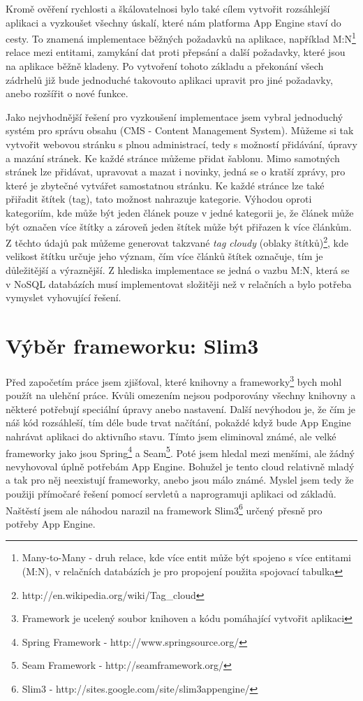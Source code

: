 Kromě ověření rychlosti a škálovatelnosi bylo také cílem vytvořit rozsáhlejší aplikaci a vyzkoušet všechny úskalí, které nám platforma App Engine staví do cesty. To znamená implementace běžných požadavků na aplikace, například M:N\footnote{Many-to-Many - druh relace, kde více entit může být spojeno s více entitami (M:N), v relačních databázích je pro propojení použita spojovací tabulka} relace mezi entitami, zamykání dat proti přepsání a další požadavky, které jsou na aplikace běžně kladeny. Po vytvoření tohoto základu a překonání všech zádrhelů již bude jednoduché takovouto aplikaci upravit pro jiné požadavky, anebo rozšířit o nové funkce.

Jako nejvhodnější řešení pro vyzkoušení implementace jsem vybral jednoduchý systém pro správu obsahu (CMS - Content Management System). Můžeme si tak vytvořit webovou  stránku s plnou administrací, tedy s možností přidávání, úpravy a mazání stránek. Ke každé stránce můžeme přidat šablonu. Mimo samotných stránek lze přidávat, upravovat a mazat i novinky, jedná se o kratší zprávy, pro které je zbytečné vytvářet samostatnou stránku. Ke každé stránce lze také přiřadit štítek (tag), tato možnost nahrazuje kategorie. Výhodou oproti kategoriím, kde může být jeden článek pouze v jedné kategorii je, že článek může být označen více štítky a zároveň jeden štítek může být přiřazen k více článkům. Z těchto údajů pak můžeme generovat takzvané \emph{tag cloudy} (oblaky štítků)\footnote{http://en.wikipedia.org/wiki/Tag\_cloud}, kde velikost štítku určuje jeho význam, čím více článků štítek označuje, tím je důležitější a výraznější. Z hlediska implementace se jedná o vazbu M:N, která se v NoSQL databázích musí implementovat složitěji než v relačních a bylo potřeba vymyslet vyhovující řešení.

\section{Výběr frameworku: Slim3}
Před započetím práce jsem zjišťoval, které knihovny a frameworky\footnote{Framework je ucelený soubor knihoven a kódu pomáhající vytvořit aplikaci} bych mohl použít na ulehční práce. Kvůli omezením nejsou podporovány všechny knihovny a některé potřebují speciální úpravy anebo nastavení. Další nevýhodou je, že čím je náš kód rozsáhleší, tím déle bude trvat načítání, pokaždé když bude App Engine nahrávat aplikaci do aktivního stavu. Tímto jsem eliminoval známé, ale velké frameworky jako jsou Spring\footnote{Spring Framework - http://www.springsource.org/} a Seam\footnote{Seam Framework - http://seamframework.org/}. Poté jsem hledal mezi menšími, ale žádný nevyhovoval úplně potřebám App Engine. Bohužel je tento cloud relativně mladý a tak pro něj neexistují frameworky, anebo jsou málo známé. Myslel jsem tedy že použiji přímočaré řešení pomocí servletů a naprogramuji aplikaci od základů. Naštěstí jsem ale náhodou narazil na framework Slim3\footnote{Slim3 - http://sites.google.com/site/slim3appengine/} určený přesně pro potřeby App Engine.

